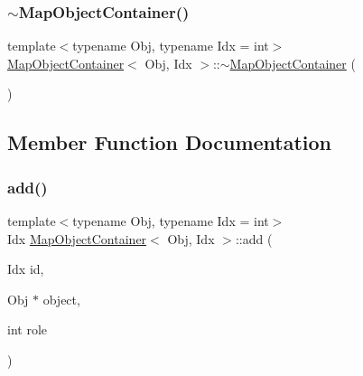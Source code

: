 \mbox{\label{class_map_object_container_ae7fd84ad97ed9207128e8441795fd4a7}} 
\subsubsection{\texorpdfstring{$\sim$MapObjectContainer()}{~MapObjectContainer()}}
{\footnotesize\ttfamily template$<$typename Obj, typename Idx = int$>$ \\
\mbox{\hyperlink{class_map_object_container}{Map\+Object\+Container}}$<$ Obj, Idx $>$\+::$\sim$\mbox{\hyperlink{class_map_object_container}{Map\+Object\+Container}} (\begin{DoxyParamCaption}{ }\end{DoxyParamCaption})\hspace{0.3cm}{\ttfamily [inline]}}



\subsection{Member Function Documentation}
\mbox{\label{class_map_object_container_ab7e0c9271847d1daaf1d4339075ea183}} 
\subsubsection{\texorpdfstring{add()}{add()}}
{\footnotesize\ttfamily template$<$typename Obj, typename Idx = int$>$ \\
Idx \mbox{\hyperlink{class_map_object_container}{Map\+Object\+Container}}$<$ Obj, Idx $>$\+::add (\begin{DoxyParamCaption}\item[{Idx}]{id,  }\item[{Obj $\ast$}]{object,  }\item[{int}]{role }\end{DoxyParamCaption})\hspace{0.3cm}{\ttfamily [inline]}}



